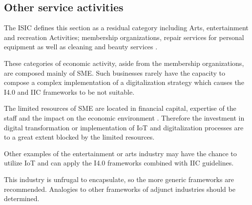 
\subsection{Other service activities}
The \ac{ISIC} defines this section as a residual category including Arts, entertainment and recreation Activities; membership organizations, repair services for personal equipment as well as cleaning and beauty services \cite[p.262ff.]{ISIC:2008}.

These categories of economic activity, aside from the membership organizations, are composed mainly of \ac{SME}. Such businesses rarely have the capacity to compose a complex implementation of a digitalization strategy which causes the \ac{I4.0} and \ac{IIC} frameworks to be not suitable.

The limited resources of \ac{SME} are located in financial capital, expertise of the staff and the impact on the economic environment \cite{JSBM:JSBM341}. Therefore the investment in digital transformation or implementation of \ac{IoT} and digitalization processes are to a great extent blocked by the limited resources.

Other examples of the entertainment or arts industry may have the chance to utilize \ac{IoT} and can apply the \ac{I4.0} frameworks combined with \ac{IIC} guidelines.

This industry is unfrugal to encapsulate, so the more generic frameworks are recommended. Analogies to other frameworks of adjunct industries should be determined.